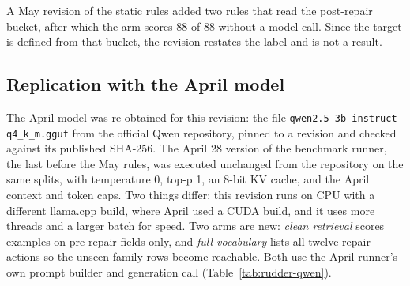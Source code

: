 \documentclass[11pt]{article}
\begin{document}
A May revision of the static rules added two rules that read the post-repair bucket, after which the arm scores 88 of 88 without a model call. Since the target is defined from that bucket, the revision restates the label and is not a result.

\subsection{Replication with the April model}

The April model was re-obtained for this revision: the file \texttt{qwen2.5-3b-instruct-q4\_k\_m.gguf} from the official Qwen repository, pinned to a revision and checked against its published SHA-256. The April 28 version of the benchmark runner, the last before the May rules, was executed unchanged from the repository on the same splits, with temperature 0, top-p 1, an 8-bit KV cache, and the April context and token caps. Two things differ: this revision runs on CPU with a different llama.cpp build, where April used a CUDA build, and it uses more threads and a larger batch for speed. Two arms are new: \emph{clean retrieval} scores examples on pre-repair fields only, and \emph{full vocabulary} lists all twelve repair actions so the unseen-family rows become reachable. Both use the April runner's own prompt builder and generation call (Table~\ref{tab:rudder-qwen}).

\begin{table}[t]
  \centering
  \small
  \resizebox{\linewidth}{!}{}
  \caption{The rudder benchmark with Qwen2.5-3B-Instruct, April run against this revision's CPU rerun of the April runner. ``Same answers'' counts rows whose repair action and commit decision both match the April row. ``Joint'' needs both decisions right.}
  \label{tab:rudder-qwen}
\end{table}
\end{document}
